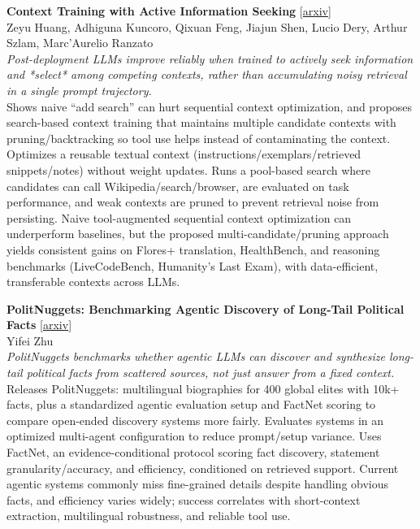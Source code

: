 \documentclass[12pt,letterpaper]{article}
\begin{document}
\medskip

{\small\textbf{Context Training with Active Information Seeking}} {\scriptsize[\href{https://arxiv.org/abs/2605.13050}{arxiv}]}\\
{\scriptsize Zeyu Huang, Adhiguna Kuncoro, Qixuan Feng, Jiajun Shen, Lucio Dery, Arthur Szlam, Marc'Aurelio Ranzato}\\

{\small\textit{Post-deployment LLMs improve reliably when trained to actively seek information and *select* among competing contexts, rather than accumulating noisy retrieval in a single prompt trajectory.}}\\[1pt]
{\footnotesize Shows naive ``add search'' can hurt sequential context optimization, and proposes search-based context training that maintains multiple candidate contexts with pruning/backtracking so tool use helps instead of contaminating the context. Optimizes a reusable textual context (instructions/exemplars/retrieved snippets/notes) without weight updates. Runs a pool-based search where candidates can call Wikipedia/search/browser, are evaluated on task performance, and weak contexts are pruned to prevent retrieval noise from persisting. Naive tool-augmented sequential context optimization can underperform baselines, but the proposed multi-candidate/pruning approach yields consistent gains on Flores+ translation, HealthBench, and reasoning benchmarks (LiveCodeBench, Humanity's Last Exam), with data-efficient, transferable contexts across LLMs.}

\medskip

{\small\textbf{PolitNuggets: Benchmarking Agentic Discovery of Long-Tail Political Facts}} {\scriptsize[\href{https://arxiv.org/abs/2605.14002}{arxiv}]}\\
{\scriptsize Yifei Zhu}\\

{\small\textit{PolitNuggets benchmarks whether agentic LLMs can discover and synthesize long-tail political facts from scattered sources, not just answer from a fixed context.}}\\[1pt]
{\footnotesize Releases PolitNuggets: multilingual biographies for 400 global elites with 10k+ facts, plus a standardized agentic evaluation setup and FactNet scoring to compare open-ended discovery systems more fairly. Evaluates systems in an optimized multi-agent configuration to reduce prompt/setup variance. Uses FactNet, an evidence-conditional protocol scoring fact discovery, statement granularity/accuracy, and efficiency, conditioned on retrieved support. Current agentic systems commonly miss fine-grained details despite handling obvious facts, and efficiency varies widely; success correlates with short-context extraction, multilingual robustness, and reliable tool use.}
\end{document}
